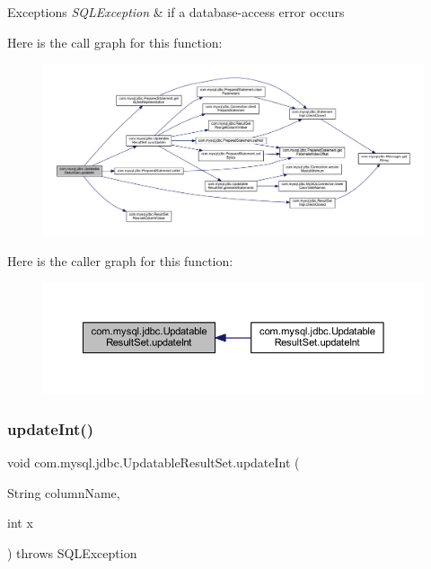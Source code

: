 \begin{DoxyExceptions}{Exceptions}
{\em S\+Q\+L\+Exception} & if a database-\/access error occurs \\
\hline
\end{DoxyExceptions}
Here is the call graph for this function\+:
\nopagebreak
\begin{figure}[H]
\begin{center}
\leavevmode
\includegraphics[width=350pt]{classcom_1_1mysql_1_1jdbc_1_1_updatable_result_set_a888635ba4ba026167fe0d1ba6a0739d0_cgraph}
\end{center}
\end{figure}
Here is the caller graph for this function\+:
\nopagebreak
\begin{figure}[H]
\begin{center}
\leavevmode
\includegraphics[width=350pt]{classcom_1_1mysql_1_1jdbc_1_1_updatable_result_set_a888635ba4ba026167fe0d1ba6a0739d0_icgraph}
\end{center}
\end{figure}
\mbox{\label{classcom_1_1mysql_1_1jdbc_1_1_updatable_result_set_a8a46dadedadd27401fd4fdd849b1ac2f}} 
\subsubsection{\texorpdfstring{update\+Int()}{updateInt()}\hspace{0.1cm}{\footnotesize\ttfamily [2/2]}}
{\footnotesize\ttfamily void com.\+mysql.\+jdbc.\+Updatable\+Result\+Set.\+update\+Int (\begin{DoxyParamCaption}\item[{String}]{column\+Name,  }\item[{int}]{x }\end{DoxyParamCaption}) throws S\+Q\+L\+Exception}

